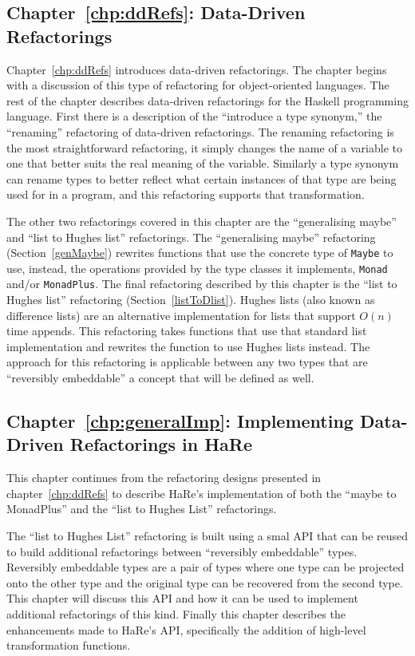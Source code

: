 \subsection*{Chapter~\ref{chp:ddRefs}: Data-Driven Refactorings}

Chapter~\ref{chp:ddRefs} introduces data-driven refactorings. The chapter begins with a discussion of this type of refactoring for object-oriented languages. The rest of the chapter describes data-driven refactorings for the Haskell programming language. First there is a description of the ``introduce a type synonym,'' the ``renaming'' refactoring of data-driven refactorings. The renaming refactoring is the most straightforward refactoring, it simply changes the name of a variable to one that better suits the real meaning of the variable. Similarly a type synonym can rename types to better reflect what certain instances of that type are being used for in a program, and this refactoring supports that transformation. 

The other two refactorings covered in this chapter are the ``generalising maybe'' and ``list to Hughes list'' refactorings. The ``generalising maybe'' refactoring (Section~\ref{genMaybe}) rewrites functions that use the concrete type of \texttt{Maybe} to use, instead, the operations provided by the type classes it implements, \texttt{Monad} and/or \texttt{MonadPlus}. The final refactoring described by this chapter is the ``list to Hughes list'' refactoring (Section~\ref{listToDlist}). Hughes lists (also known as difference lists) are an alternative implementation for lists that support $O(n)$ time appends. This refactoring takes functions that use that standard list implementation and rewrites the function to use Hughes lists instead. The approach for this refactoring is applicable between any two types that are ``reversibly embeddable'' a concept that will be defined as well.

\subsection*{Chapter~\ref{chp:generalImp}: Implementing Data-Driven Refactorings in HaRe}

This chapter continues from the refactoring designs presented in chapter~\ref{chp:ddRefs} to describe HaRe's implementation of both the ``maybe to MonadPlus'' and the ``list to Hughes List'' refactorings. 

The ``list to Hughes List'' refactoring is built using a smal API that can be reused to build additional refactorings between ``reversibly embeddable'' types. Reversibly embeddable types are a pair of types where one type can be projected onto the other type and the original type can be recovered from the second type. This chapter will discuss this API and how it can be used to implement additional refactorings of this kind. Finally this chapter describes the enhancements made to HaRe's API, specifically the addition of high-level transformation functions.

